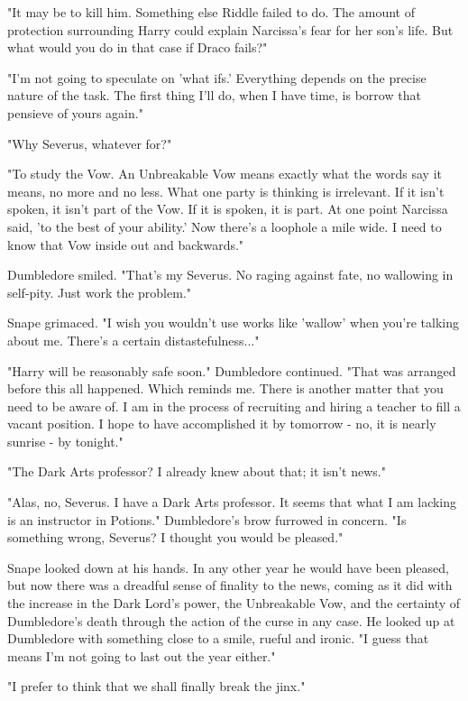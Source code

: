 \documentclass[a4paper,11pt]{article}
\begin{document}
"It may be to kill him. Something else Riddle failed to do. The amount of protection surrounding Harry could explain Narcissa's fear for her son's life. But what would you do in that case if Draco fails?"

"I'm not going to speculate on 'what ifs.' Everything depends on the precise nature of the task. The first thing I'll do, when I have time, is borrow that pensieve of yours again."

"Why Severus, whatever for?"

"To study the Vow. An Unbreakable Vow means exactly what the words say it means, no more and no less. What one party is thinking is irrelevant. If it isn't spoken, it isn't part of the Vow. If it is spoken, it is part. At one point Narcissa said, 'to the best of your ability.' Now there's a loophole a mile wide. I need to know that Vow inside out and backwards."

Dumbledore smiled. "That's my Severus. No raging against fate, no wallowing in self-pity. Just work the problem."

Snape grimaced. "I wish you wouldn't use works like 'wallow' when you're talking about me. There's a certain distastefulness..."

"Harry will be reasonably safe soon." Dumbledore continued. "That was arranged before this all happened. Which reminds me. There is another matter that you need to be aware of. I am in the process of recruiting and hiring a teacher to fill a vacant position. I hope to have accomplished it by tomorrow - no, it is nearly sunrise - by tonight."

"The Dark Arts professor? I already knew about that; it isn't news."

"Alas, no, Severus. I have a Dark Arts professor. It seems that what I am lacking is an instructor in Potions." Dumbledore's brow furrowed in concern. "Is something wrong, Severus? I thought you would be pleased."

Snape looked down at his hands. In any other year he would have been pleased, but now there was a dreadful sense of finality to the news, coming as it did with the increase in the Dark Lord's power, the Unbreakable Vow, and the certainty of Dumbledore's death through the action of the curse in any case. He looked up at Dumbledore with something close to a smile, rueful and ironic. "I guess that means I'm not going to last out the year either."

"I prefer to think that we shall finally break the jinx."
\end{document}
